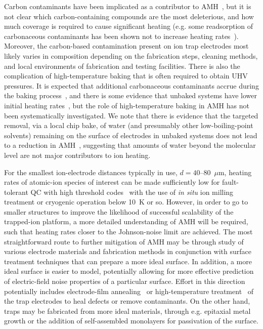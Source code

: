 \documentclass[%
reprint,
 amsmath,amssymb,
]{revtex4-1}
\begin{document}
Carbon contaminants have been implicated as a contributor to AMH~\cite{PhysRevA.95.033407_2017}, but it is not clear which carbon-containing compounds are the most deleterious, and how much coverage is required to cause significant heating (e.g. some readsorption of carbonaceous contaminants has been shown not to increase heating rates~\cite{PhysRevB.89.245435_2014}).  Moreover, the carbon-based contamination present on ion trap electrodes most likely varies in composition depending on the fabrication steps, cleaning methods, and local environments of fabrication and testing facilities.  There is also the complication of high-temperature baking that is often required to obtain UHV pressures.  It is expected that additional carbonaceous contaminants accrue during the baking process~\cite{hite_colombe_wilson_allcock_leibfried_wineland_pappas_2013,PhysRevB.89.245435_2014}, and there is some evidence that unbaked systems have lower initial heating rates~\cite{PhysRevA.89.012318_2014,PhysRevA.91.041402_2015}, but the role of high-temperature baking in AMH has not been systematically investigated.  We note that there is evidence that the targeted removal, via a local chip bake, of water (and presumably other low-boiling-point solvents) remaining on the surface of electrodes in unbaked systems does not lead to a reduction in AMH~\cite{PhysRevA.91.041402_2015}, suggesting that amounts of water beyond the molecular level are not major contributors to ion heating.

For the smallest ion-electrode distances typically in use, $d=40$--$80$~$\mu$m, heating rates of atomic-ion species of interest can be made sufficiently low for fault-tolerant QC with high threshold codes~\cite{PhysRevA.80.052312_2009} with the use of \textit{in situ} ion milling treatment or cryogenic operation below 10~K or so.  However, in order to go to smaller structures to improve the likelihood of successful scalability of the trapped-ion platform, a more detailed understanding of AMH will be required, such that heating rates closer to the Johnson-noise limit are achieved.  The most straightforward route to further mitigation of AMH may be through study of various electrode materials and fabrication methods in conjunction with surface treatment techniques that can prepare a more ideal surface.  In addition, a more ideal surface is easier to model, potentially allowing for more effective prediction of electric-field noise properties of a particular surface.  Effort in this direction potentially includes electrode-film annealing~\cite{PhysRevLett.100.013001_2008_1} or high-temperature treatment~\cite{UCB_heater_heating_rates_2018} of the trap electrodes to heal defects or remove contaminants.  On the other hand, traps may be fabricated from more ideal materials, through e.g. epitaxial metal growth or the addition of self-assembled monolayers for passivation of the surface.
\end{document}
